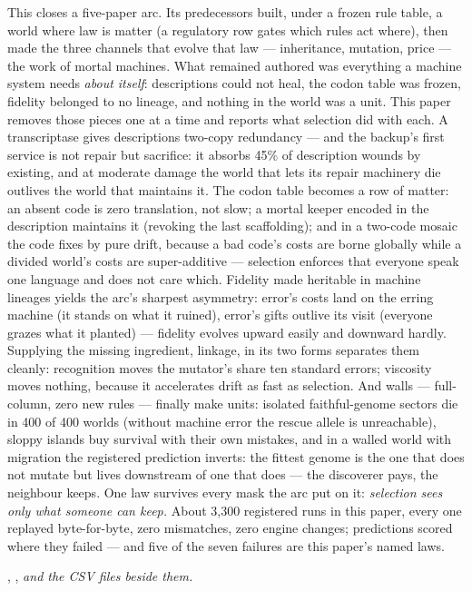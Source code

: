 This closes a five-paper arc. Its predecessors built, under a
frozen rule table, a world where law is matter (a regulatory row
gates which rules act where), then made the three channels that
evolve that law --- inheritance, mutation, price --- the work of
mortal machines. What remained authored was everything a machine
system needs {\it about itself}: descriptions could not heal, the
codon table was frozen, fidelity belonged to no lineage, and
nothing in the world was a unit. This paper removes those pieces
one at a time and reports what selection did with each. A
transcriptase gives descriptions two-copy redundancy --- and the
backup's first service is not repair but sacrifice: it absorbs
45\% of description wounds by existing, and at moderate damage the
world that lets its repair machinery die outlives the world that
maintains it. The codon table becomes a row of matter: an absent
code is zero translation, not slow; a mortal keeper encoded in the
description maintains it (revoking the last scaffolding); and in
a two-code mosaic the code fixes by pure drift, because a bad
code's costs are borne globally while a divided world's costs are
super-additive --- selection enforces that everyone speak one
language and does not care which. Fidelity made heritable in
machine lineages yields the arc's sharpest asymmetry: error's
costs land on the erring machine (it stands on what it ruined),
error's gifts outlive its visit (everyone grazes what it
planted) --- fidelity evolves upward easily and downward hardly.
Supplying the missing ingredient, linkage, in its two forms
separates them cleanly: recognition moves the mutator's share ten
standard errors; viscosity moves nothing, because it accelerates
drift as fast as selection. And walls --- full-column, zero new
rules --- finally make units: isolated faithful-genome sectors die
in 400 of 400 worlds (without machine error the rescue allele is
unreachable), sloppy islands buy survival with their own
mistakes, and in a walled world with migration the registered
prediction inverts: the fittest genome is the one that does not
mutate but lives downstream of one that does --- the discoverer
pays, the neighbour keeps. One law survives every mask the arc
put on it: {\it selection sees only what someone can keep.}
About 3{,}300 registered runs in this paper, every one replayed
byte-for-byte, zero mismatches, zero engine changes; predictions
scored where they failed --- and five of the seven failures are
this paper's named laws.

\medskip
{}
,
, {\it and the CSV files
beside them.}

